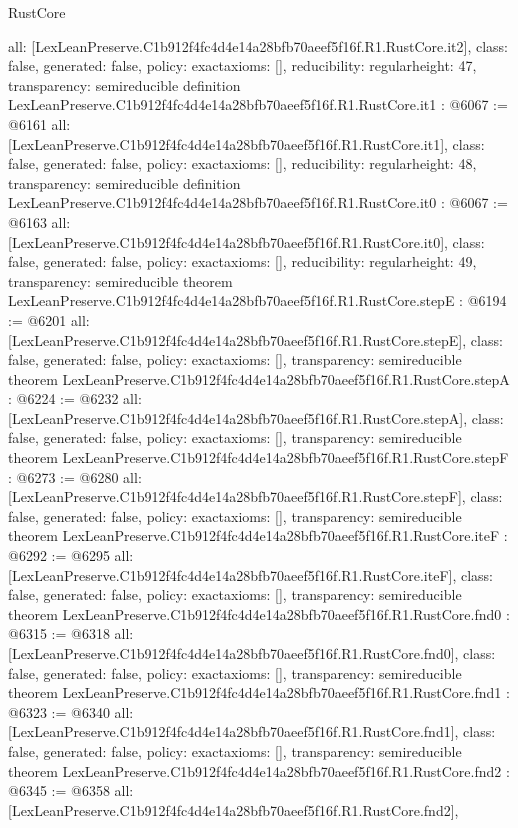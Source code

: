 \begin{lexlean}{RustCore}
\begin{coremodule}
{  all: [LexLeanPreserve.C1b912f4fc4d4e14a28bfb70aeef5f16f.R1.RustCore.it2],
  class: false,
  generated: false,
  policy: exact{axioms: []},
  reducibility: regular{height: 47},
  transparency: semireducible
}
definition LexLeanPreserve.C1b912f4fc4d4e14a28bfb70aeef5f16f.R1.RustCore.it1 : @6067 := @6161 {
  all: [LexLeanPreserve.C1b912f4fc4d4e14a28bfb70aeef5f16f.R1.RustCore.it1],
  class: false,
  generated: false,
  policy: exact{axioms: []},
  reducibility: regular{height: 48},
  transparency: semireducible
}
definition LexLeanPreserve.C1b912f4fc4d4e14a28bfb70aeef5f16f.R1.RustCore.it0 : @6067 := @6163 {
  all: [LexLeanPreserve.C1b912f4fc4d4e14a28bfb70aeef5f16f.R1.RustCore.it0],
  class: false,
  generated: false,
  policy: exact{axioms: []},
  reducibility: regular{height: 49},
  transparency: semireducible
}
theorem LexLeanPreserve.C1b912f4fc4d4e14a28bfb70aeef5f16f.R1.RustCore.stepE : @6194 := @6201 {
  all: [LexLeanPreserve.C1b912f4fc4d4e14a28bfb70aeef5f16f.R1.RustCore.stepE],
  class: false,
  generated: false,
  policy: exact{axioms: []},
  transparency: semireducible
}
theorem LexLeanPreserve.C1b912f4fc4d4e14a28bfb70aeef5f16f.R1.RustCore.stepA : @6224 := @6232 {
  all: [LexLeanPreserve.C1b912f4fc4d4e14a28bfb70aeef5f16f.R1.RustCore.stepA],
  class: false,
  generated: false,
  policy: exact{axioms: []},
  transparency: semireducible
}
theorem LexLeanPreserve.C1b912f4fc4d4e14a28bfb70aeef5f16f.R1.RustCore.stepF : @6273 := @6280 {
  all: [LexLeanPreserve.C1b912f4fc4d4e14a28bfb70aeef5f16f.R1.RustCore.stepF],
  class: false,
  generated: false,
  policy: exact{axioms: []},
  transparency: semireducible
}
theorem LexLeanPreserve.C1b912f4fc4d4e14a28bfb70aeef5f16f.R1.RustCore.iteF : @6292 := @6295 {
  all: [LexLeanPreserve.C1b912f4fc4d4e14a28bfb70aeef5f16f.R1.RustCore.iteF],
  class: false,
  generated: false,
  policy: exact{axioms: []},
  transparency: semireducible
}
theorem LexLeanPreserve.C1b912f4fc4d4e14a28bfb70aeef5f16f.R1.RustCore.fnd0 : @6315 := @6318 {
  all: [LexLeanPreserve.C1b912f4fc4d4e14a28bfb70aeef5f16f.R1.RustCore.fnd0],
  class: false,
  generated: false,
  policy: exact{axioms: []},
  transparency: semireducible
}
theorem LexLeanPreserve.C1b912f4fc4d4e14a28bfb70aeef5f16f.R1.RustCore.fnd1 : @6323 := @6340 {
  all: [LexLeanPreserve.C1b912f4fc4d4e14a28bfb70aeef5f16f.R1.RustCore.fnd1],
  class: false,
  generated: false,
  policy: exact{axioms: []},
  transparency: semireducible
}
theorem LexLeanPreserve.C1b912f4fc4d4e14a28bfb70aeef5f16f.R1.RustCore.fnd2 : @6345 := @6358 {
  all: [LexLeanPreserve.C1b912f4fc4d4e14a28bfb70aeef5f16f.R1.RustCore.fnd2],
}
\end{coremodule}
\end{lexlean}
